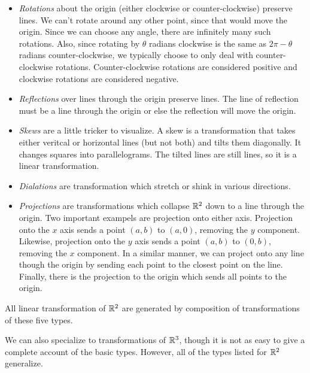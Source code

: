 \documentclass[fleqn,letterpaper]{report}
\begin{document}
\begin{itemize}
\item \emph{Rotations} about the origin (either
clockwise or counter-clockwise) 
preserve lines. We can't rotate around any other point,
since that would move the origin. Since we can choose any
angle, there are infinitely many such rotations. Also, since
rotating by $\theta$ radians clockwise is the same as $2\pi -
\theta$ radians counter-clockwise, we typically choose to only
deal with counter-clockwise rotations. Counter-clockwise
rotations are considered positive and clockwise rotations are
considered negative.
\item \emph{Reflections} over lines through the origin 
preserve lines. The line of reflection must be a line  through
the origin or else the reflection will move the origin.
\item \emph{Skews} are a little tricker to visualize. A skew
is a transformation that takes either veritcal or horizontal
lines (but not both) and tilts them diagonally. It changes
squares into parallelograms. The tilted lines are still
lines, so it is a linear transformation.
\item \emph{Dialations} are transformation which stretch or
shink in various directions. 
\item \emph{Projections} are transformations which collapse
$\mathbb{R}^2$ down to a line through the origin. Two important
exampels are projection onto either axis. Projection onto the
$x$ axis sends a point $(a,b)$ to $(a,0)$, removing the $y$
component. Likewise, projection onto the $y$ axis sends a point
$(a,b)$ to $(0,b)$, removing the $x$ component. In a similar
manner, we can project onto any line though the origin by
sending each point to the closest point on the line. Finally,
there is the projection to the origin which sends all points to
the origin.
\end{itemize}

All linear transformation of $\mathbb{R}^2$ are generated by
composition of transformations of these five types.

We can also specialize to transformations of $\mathbb{R}^3$, though it
is not as easy to give a complete account of the basic types.
However, all of the types listed for $\mathbb{R}^2$ generalize.
\end{document}
